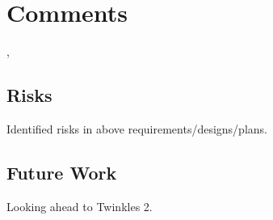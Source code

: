 \section{Comments}
\def\secname{\chpname:comments}
\label{\secname}

,


\subsection{Risks}

Identified risks in above requirements/designs/plans.


\subsection{Future Work}

Looking ahead to Twinkles 2.

